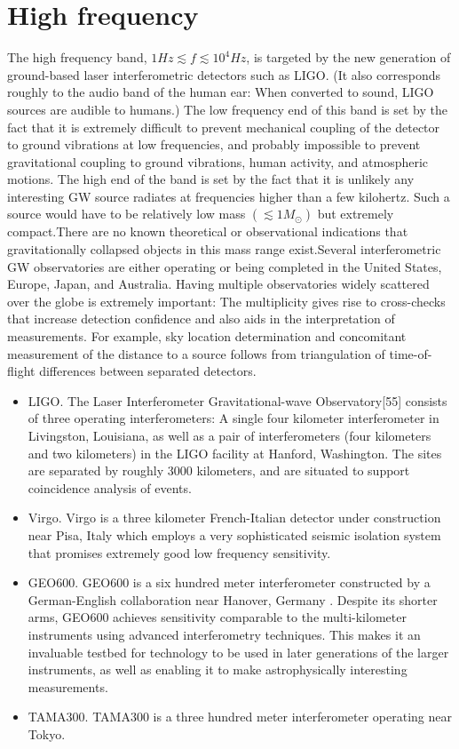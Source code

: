 \documentclass[binding=0.6cm, LaM]{sapthesis}
\begin{document}
\section{High frequency}
The high frequency band, $1Hz \apprle f \apprle 10^4 Hz$, is targeted by the new generation of ground-based laser interferometric detectors such as LIGO. (It also corresponds roughly to the audio band of the human ear: When converted to sound, LIGO sources are audible to humans.) The low frequency end of this band is set by the fact that it is extremely difficult to prevent mechanical coupling of the detector to ground vibrations at low frequencies, and probably impossible to prevent gravitational coupling to ground vibrations, human activity, and atmospheric motions.
The high end of the band is set by the fact that it is unlikely any interesting GW source radiates at frequencies higher than a few kilohertz. Such a source would have to be relatively low mass $(\apprle 1M_{\odot})$ but extremely compact.There are no known theoretical or observational indications that gravitationally collapsed objects in this mass range exist.Several interferometric GW observatories are either operating or being completed in the United States, Europe, Japan, and Australia. Having multiple observatories widely scattered over the globe is extremely important: The multiplicity gives rise to cross-checks that increase detection confidence and also aids in the interpretation of measurements. For example, sky location determination and concomitant measurement of the distance to a source follows from triangulation of time-of-flight differences between separated detectors.
\begin{itemize}
  \item LIGO. The Laser Interferometer Gravitational-wave Observatory[55] consists of three operating interferometers: A single four kilometer interferometer in Livingston, Louisiana, as well as a pair of interferometers (four kilometers and two kilometers) in the LIGO facility at Hanford, Washington. The sites are separated by roughly 3000 kilometers, and are situated to support coincidence analysis of events.
  \item Virgo. Virgo is a three kilometer French-Italian detector under construction near Pisa, Italy which employs a very sophisticated seismic isolation system that promises extremely good low frequency sensitivity.
  \item GEO600. GEO600 is a six hundred meter interferometer constructed by a German-English collaboration near Hanover, Germany . Despite its shorter arms, GEO600 achieves sensitivity comparable to the multi-kilometer instruments using advanced interferometry techniques. This makes it an invaluable testbed for technology to be used in later generations of the larger instruments, as well as enabling it to make astrophysically interesting measurements.
  \item TAMA300. TAMA300 is a three hundred meter interferometer operating near Tokyo. 
   
\end{itemize}
\end{document}

